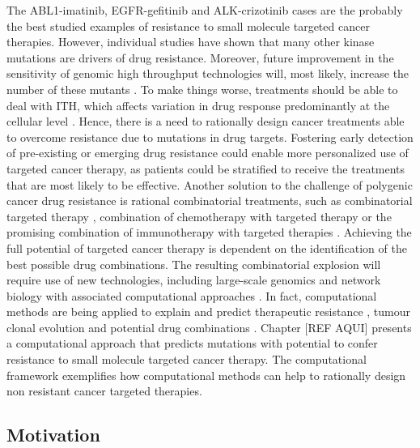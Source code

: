 \documentclass[12pt, b5paper,twoside]{tesi_upf}
\begin{document}
\par The ABL1-imatinib, EGFR-gefitinib and ALK-crizotinib cases are the probably the best studied examples of resistance to small molecule targeted cancer therapies. However, individual studies have shown that many other kinase mutations are drivers of drug resistance. Moreover, future improvement in the sensitivity of genomic high throughput technologies will, most likely, increase the number of these mutants \cite{Schmitt2015}. To make things worse, treatments should be able to deal with ITH, which affects variation in drug response predominantly at the cellular level \cite{Burrell2014}. Hence, there is a need to rationally design cancer treatments able to overcome resistance due to mutations in drug targets. Fostering early detection of pre-existing or emerging drug resistance could enable more personalized use of targeted cancer therapy, as patients could be stratified to receive the treatments that are most likely to be effective. Another solution to the challenge of polygenic cancer drug resistance is rational combinatorial treatments, such as combinatorial targeted therapy \cite{Flaherty2012}, combination of chemotherapy with targeted therapy \cite{Cortes2016} or the promising combination of immunotherapy with targeted therapies \cite{Vanneman2012}. Achieving the full potential of targeted cancer therapy is dependent on the identification of the best possible drug combinations. The resulting combinatorial explosion will require use of new technologies, including large-scale genomics and network biology with associated computational approaches \cite{Al-Lazikani2012}. In fact, computational methods are being applied to explain and predict therapeutic resistance \cite{Bozic2013, Komarova2014}, tumour clonal evolution \cite{Williams2016, Attolini2010} and potential drug combinations \cite{Chmielecki2011, Huang2007}. Chapter [REF AQUI] presents a computational approach that predicts mutations with potential to confer resistance to small molecule targeted cancer therapy. The computational framework exemplifies how computational methods can help to rationally design non resistant cancer targeted therapies. 

 
\subsection{Motivation}
\end{document}
